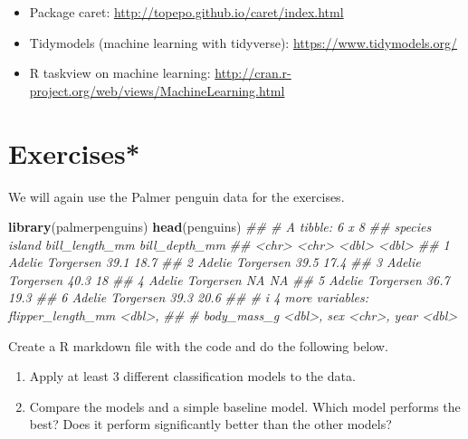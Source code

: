 \documentclass[
  notitlepage]{book}
\newenvironment{Shaded}{\begin{snugshade}}{\end{snugshade}}
\newcommand{\CommentTok}[1]{\textcolor[rgb]{0.56,0.35,0.01}{\textit{#1}}}
\newcommand{\KeywordTok}[1]{\textcolor[rgb]{0.13,0.29,0.53}{\textbf{#1}}}
\newcommand{\NormalTok}[1]{#1}
\providecommand{\tightlist}{%
  \setlength{\itemsep}{0pt}\setlength{\parskip}{0pt}}
\begin{document}
\begin{itemize}
\tightlist
\item
  Package caret: \url{http://topepo.github.io/caret/index.html}
\item
  Tidymodels (machine learning with tidyverse):
  \url{https://www.tidymodels.org/}
\item
  R taskview on machine learning:
  \url{http://cran.r-project.org/web/views/MachineLearning.html}
\end{itemize}

\hypertarget{exercises-2}{%
\section{Exercises*}\label{exercises-2}}

We will again use the Palmer penguin data for the exercises.

\begin{Shaded}
\begin{Highlighting}[]
\KeywordTok{library}\NormalTok{(palmerpenguins)}
\KeywordTok{head}\NormalTok{(penguins)}
\CommentTok{\#\# \# A tibble: 6 x 8}
\CommentTok{\#\#   species island    bill\_length\_mm bill\_depth\_mm}
\CommentTok{\#\#   \textless{}chr\textgreater{}   \textless{}chr\textgreater{}              \textless{}dbl\textgreater{}         \textless{}dbl\textgreater{}}
\CommentTok{\#\# 1 Adelie  Torgersen           39.1          18.7}
\CommentTok{\#\# 2 Adelie  Torgersen           39.5          17.4}
\CommentTok{\#\# 3 Adelie  Torgersen           40.3          18  }
\CommentTok{\#\# 4 Adelie  Torgersen           NA            NA  }
\CommentTok{\#\# 5 Adelie  Torgersen           36.7          19.3}
\CommentTok{\#\# 6 Adelie  Torgersen           39.3          20.6}
\CommentTok{\#\# \# i 4 more variables: flipper\_length\_mm \textless{}dbl\textgreater{},}
\CommentTok{\#\# \#   body\_mass\_g \textless{}dbl\textgreater{}, sex \textless{}chr\textgreater{}, year \textless{}dbl\textgreater{}}
\end{Highlighting}
\end{Shaded}

Create a R markdown file with the code and do the following below.

\begin{enumerate}
\def\labelenumi{\arabic{enumi}.}
\tightlist
\item
  Apply at least 3 different classification models to the data.
\item
  Compare the models and a simple baseline model. Which model
  performs the best? Does it perform significantly better than the other
  models?
\end{enumerate}
\end{document}
